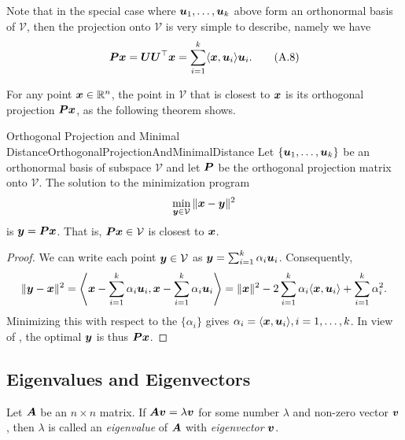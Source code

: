 Note that in the special case where \(\boldsymbol{u}_1, \dots, \boldsymbol{u}_k\) above form an orthonormal basis of \(\mathcal{V}\), then the projection onto \(\mathcal{V}\) is very simple to describe, namely we have
\begin{equation}
	\boldsymbol{Px} = \boldsymbol{U U}^\top \boldsymbol{x} = \sum_{i=1}^k \langle \boldsymbol{x}, \boldsymbol{u}_i \rangle \boldsymbol{u}_i. \tag{A.8}
	\label{eq:OrthonormalProjectionSum}
\end{equation}

For any point \(\boldsymbol{x} \in \mathbb{R}^n\), the point in \(\mathcal{V}\) that is closest to \(\boldsymbol{x}\) is its orthogonal projection \(\boldsymbol{Px}\), as the following theorem shows.

\begin{thm}{Orthogonal Projection and Minimal Distance}{OrthogonalProjectionAndMinimalDistance}
	Let \(\{\boldsymbol{u}_1, \dots, \boldsymbol{u}_k\}\) be an orthonormal basis of subspace \(\mathcal{V}\) and let \(\boldsymbol{P}\) be the orthogonal projection matrix onto \(\mathcal{V}\). The solution to the minimization program
	\begin{equation*}
		\min_{\boldsymbol{y} \in \mathcal{V}} \|\boldsymbol{x} - \boldsymbol{y}\|^2
	\end{equation*}
	is \(\boldsymbol{y} = \boldsymbol{Px}\). That is, \(\boldsymbol{Px} \in \mathcal{V}\) is closest to \(\boldsymbol{x}\).
\end{thm}

\begin{proof}
	We can write each point \(\boldsymbol{y} \in \mathcal{V}\) as \(\boldsymbol{y} = \sum_{i=1}^k \alpha_i \boldsymbol{u}_i\). Consequently,
	\begin{equation*}
		\|\boldsymbol{y} - \boldsymbol{x}\|^2 = \left\langle \boldsymbol{x} - \sum_{i=1}^k \alpha_i \boldsymbol{u}_i, \boldsymbol{x} - \sum_{i=1}^k \alpha_i \boldsymbol{u}_i \right\rangle = \|\boldsymbol{x}\|^2 - 2 \sum_{i=1}^k \alpha_i \langle \boldsymbol{x}, \boldsymbol{u}_i \rangle + \sum_{i=1}^k \alpha_i^2.
	\end{equation*}
	Minimizing this with respect to the \(\{\alpha_i\}\) gives \(\alpha_i = \langle \boldsymbol{x}, \boldsymbol{u}_i \rangle, i = 1, \dots, k\). In view of , the optimal \(\boldsymbol{y}\) is thus \(\boldsymbol{Px}\).
\end{proof}

\subsection{Eigenvalues and Eigenvectors}
Let \(\boldsymbol{A}\) be an \(n \times n\) matrix. If \(\boldsymbol{A}\boldsymbol{v} = \lambda \boldsymbol{v}\) for some number \(\lambda\) and non-zero vector \(\boldsymbol{v}\), then \(\lambda\) is called an \textit{eigenvalue} of \(\boldsymbol{A}\) with \textit{eigenvector} \(\boldsymbol{v}\).

